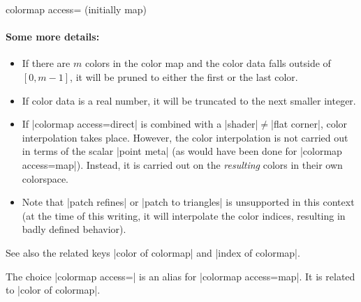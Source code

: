 \begin{pgfplotskey}{colormap access= (initially map)}
	\paragraph{Some more details:}
	\begin{itemize}
		\item If there are $m$ colors in the color map and the color data falls outside of $[0,m-1]$, it will be pruned to either the first or the last color.
		\item If color data is a real number, it will be truncated to the next smaller integer.
		\item If |colormap access=direct| is combined with a |shader|$\neq$|flat corner|, color interpolation takes place. However, the color interpolation is not carried out in terms of the scalar |point meta| (as would have been done for |colormap access=map|). Instead, it is carried out on the \emph{resulting} colors in their own colorspace. 

		\item Note that |patch refines| or |patch to triangles| is unsupported in this context (at the time of this writing, it will interpolate the color indices, resulting in badly defined behavior).

	\end{itemize}

	See also the related keys |color of colormap| and |index of colormap|.

	
	The choice |colormap access=| is an alias for |colormap access=map|. It is related to |color of colormap|.


\end{pgfplotskey}
